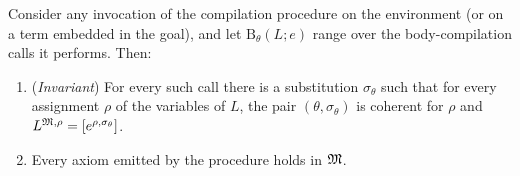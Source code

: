 \begin{lemma}
\label{lem:compile-sound}
Consider any invocation of the compilation procedure on the environment
(or on a term embedded in the goal), and let
$\mathrm{B}_\theta(L; e)$ range over the body-compilation calls it
performs.  Then:
\begin{enumerate}[leftmargin=2em]
\item (\emph{Invariant}) For every such call there is a substitution
  $\sigma_\theta$ such that for every assignment $\rho$ of the variables
  of $L$, the pair $(\theta, \sigma_\theta)$ is coherent for $\rho$ and
  $L^{\mathfrak{M},\rho} = [e^{\rho, \sigma_\theta}]$.
\item Every axiom emitted by the procedure holds in $\mathfrak{M}$.
\end{enumerate}
\end{lemma}

